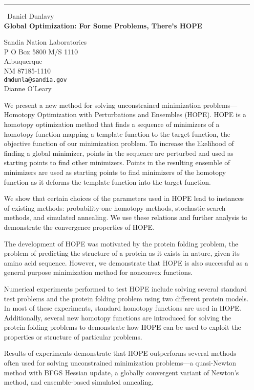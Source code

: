\documentclass{report}
\begin{document}
\begin{center}
\rule{6in}{1pt} \
{\large Daniel Dunlavy \\
{\bf Global Optimization: For Some Problems, There's HOPE}}

Sandia Nation Laboratories \\ P O Box 5800 M/S 1110 \\ Albuquerque \\ NM 87185-1110
\\
{\tt dmdunla@sandia.gov}\\
Dianne O'Leary\end{center}

We present a new method for solving unconstrained minimization
problems---Homotopy Optimization with Perturbations and Ensembles (HOPE).
HOPE is a homotopy optimization method that finds a sequence of
minimizers of a homotopy function mapping a template function to the
target function, the objective function of our minimization problem. To
increase the likelihood of finding a global minimizer, points in the
sequence are perturbed and used as starting points to find other
minimizers. Points in the resulting ensemble of minimizers are used as
starting points to find minimizers of the homotopy function as it deforms
the template function into the target function.

We show that certain choices of the parameters used in HOPE lead to
instances of existing methods: probability-one homotopy methods,
stochastic search methods, and simulated annealing. We use these
relations and further analysis to demonstrate the convergence properties
of HOPE.

The development of HOPE was motivated by the protein folding problem, the
problem of predicting the structure of a protein as it exists in nature,
given its amino acid sequence. However, we demonstrate that HOPE is also
successful as a general purpose minimization method for nonconvex
functions.

Numerical experiments performed to test HOPE include solving several
standard test problems and the protein folding problem using two
different protein models. In most of these experiments, standard homotopy
functions are used in HOPE. Additionally, several new homotopy functions
are introduced for solving the protein folding problems to demonstrate
how HOPE can be used to exploit the properties or structure of particular
problems.

Results of experiments demonstrate that HOPE outperforms several
methods often used for solving unconstrained minimization problems---a
quasi-Newton method with BFGS Hessian update, a globally convergent
variant of Newton's method, and ensemble-based simulated annealing.
\end{document}
